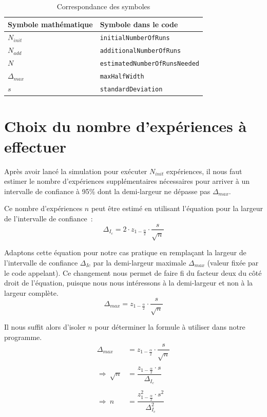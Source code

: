 \documentclass[paper=a4, fontsize=11pt]{scrartcl}
\begin{document}
\begin{table}
  \centering
  \begin{tabular}{|l|l|}
    \hline
    Symbole mathématique & Symbole dans le code \\
    \hline
    $N_{init}$ & \texttt{initialNumberOfRuns} \\
    $N_{add}$ & \texttt{additionalNumberOfRuns} \\
    $N$ & \texttt{estimatedNumberOfRunsNeeded} \\
    $\Delta_{max}$ & \texttt{maxHalfWidth} \\
    $s$ & \texttt{standardDeviation} \\
    \hline
  \end{tabular}
  \caption{Correspondance des symboles}
  \label{table:correspondance}
\end{table}

\section{Choix du nombre d'expériences à effectuer}

Après avoir lancé la simulation pour exécuter $N_{init}$ expériences, il nous faut estimer le nombre d'expériences supplémentaires nécessaires pour arriver à un intervalle de confiance à 95\% dont la demi-largeur ne dépasse pas $\Delta_{max}$.

Ce nombre d'expériences $n$ peut être estimé en utilisant l'équation pour la largeur de l'intervalle de confiance~:
\begin{equation*}
  \Delta_{I_c} = 2\cdot z_{1-\frac{\alpha}{2}}\cdot \dfrac{s}{\sqrt{n}}
\end{equation*}

Adaptons cette équation pour notre cas pratique en remplaçant la largeur de l'intervalle de confiance $\Delta_{Ic}$ par la demi-largeur maximale $\Delta_{max}$ (valeur fixée par le code appelant). Ce changement nous permet de faire fi du facteur deux du côté droit de l'équation, puisque nous nous intéressons à la demi-largeur et non à la largeur complète.
\begin{equation*}
  \Delta_{max} = z_{1-\frac{\alpha}{2}}\cdot \dfrac{s}{\sqrt{n}}
\end{equation*}

Il nous suffit alors d'isoler $n$ pour déterminer la formule à utiliser dans notre programme.
\begin{align*}
  \Delta_{max} &= z_{1-\frac{\alpha}{2}}\cdot \dfrac{s}{\sqrt{n}} \\ \\
  \Rightarrow \ \sqrt{n} &= \dfrac{z_{1-\frac{\alpha}{2}}\cdot s}{\Delta_{I_c}} \\ \\
  \Rightarrow \ n &= \dfrac{z_{1-\frac{\alpha}{2}}^2\cdot s^2}{\Delta_{I_c}^2}
\end{align*}
\end{document}
